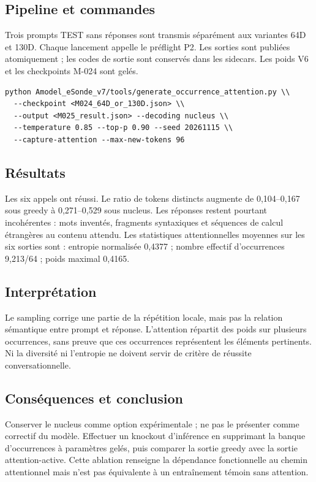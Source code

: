 \documentclass[11pt,a4paper]{report}
\begin{document}
\subsection{Pipeline et commandes}
Trois prompts TEST sans réponses sont transmis séparément aux variantes 64D et 130D. Chaque lancement appelle le préflight P2. Les sorties sont publiées atomiquement ; les codes de sortie sont conservés dans les sidecars. Les poids V6 et les checkpoints M-024 sont gelés.
\begin{verbatim}
python Amodel_eSonde_v7/tools/generate_occurrence_attention.py \\
  --checkpoint <M024_64D_or_130D.json> \\
  --output <M025_result.json> --decoding nucleus \\
  --temperature 0.85 --top-p 0.90 --seed 20261115 \\
  --capture-attention --max-new-tokens 96
\end{verbatim}

\subsection{Résultats}
Les six appels ont réussi. Le ratio de tokens distincts augmente de 0,104--0,167 sous greedy à 0,271--0,529 sous nucleus. Les réponses restent pourtant incohérentes : mots inventés, fragments syntaxiques et séquences de calcul étrangères au contenu attendu. Les statistiques attentionnelles moyennes sur les six sorties sont : entropie normalisée 0,4377 ; nombre effectif d'occurrences 9,213/64 ; poids maximal 0,4165.

\subsection{Interprétation}
Le sampling corrige une partie de la répétition locale, mais pas la relation sémantique entre prompt et réponse. L'attention répartit des poids sur plusieurs occurrences, sans preuve que ces occurrences représentent les éléments pertinents. Ni la diversité ni l'entropie ne doivent servir de critère de réussite conversationnelle.

\subsection{Conséquences et conclusion}
Conserver le nucleus comme option expérimentale ; ne pas le présenter comme correctif du modèle. Effectuer un knockout d'inférence en supprimant la banque d'occurrences à paramètres gelés, puis comparer la sortie greedy avec la sortie attention-active. Cette ablation renseigne la dépendance fonctionnelle au chemin attentionnel mais n'est pas équivalente à un entraînement témoin sans attention.
\end{document}
